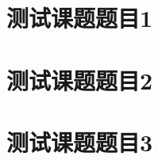 \documentclass[color=green]{textbook-cn}%
\begin{document}
\begin{Project}

\makeatletter


	
\section{测试课题题目1}

\begin{Definition}[定义名称]
\lipsum[1]
\end{Definition}



\begin{Thinking*}
	\lipsum[2]
\end{Thinking*}


\section{测试课题题目2}

\begin{Definition}[定义名称]
\lipsum[1]
\end{Definition}


\Example{\lipsum[2]}


\section{测试课题题目3}

\begin{Definition}[定义名称]
\lipsum[1]
\end{Definition}




\makeatother

\end{Project}
\end{document}
